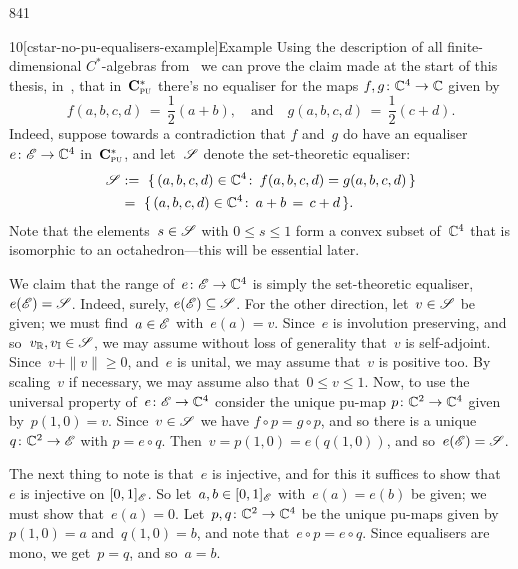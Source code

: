 \begin{parsec}{841}%
\begin{point}{10}[cstar-no-pu-equalisers-example]{Example}%
Using the description of all finite-dimensional $C^*$-algebras
    from~
we can prove the  claim made at the start of this thesis,
in~,
that in~$\mathbf{C}^*_{\text{\textsc{pu}}}$ there's no equaliser
for the maps $f,g\colon \mathbb{C}^4\to \mathbb{C}$
given  by
\begin{equation*}
\textstyle
f(a,b,c,d)\,=\, \frac{1}{2}(a+b),
\quad \text{and}\quad
g(a,b,c,d)\,=\, \frac{1}{2}(c+d).
\end{equation*}
Indeed, suppose towards a contradiction
that $f$ and~$g$ do have an
equaliser $e\colon \mathscr{E}\to\mathbb{C}^4$ in~$\mathbf{C}^*_{\text{\textsc{pu}}}$,
and let~$\mathscr{S}$
denote the set-theoretic equaliser:
\begin{alignat*}{3}
    \mathscr{S} &:=\ \{\,(a,b,c,d)\in\mathbb{C}^4\colon\, f(a,b,c,d)=g(a,b,c,d)\,\}\\
    &=\ \{\,(a,b,c,d)\in\mathbb{C}^4\colon\,a+b\,=\,c+d\,\}.
\end{alignat*}
Note that the elements~$s\in \mathscr{S}$
with $0\leq s\leq 1$
form a convex subset of~$\mathbb{C}^4$ that is isomorphic
to an octahedron---this will be essential later.

We claim that the range of~$e\colon \mathscr{E}\to\mathbb{C}^4$
is simply the set-theoretic equaliser, $e(\mathscr{E})=\mathscr{S}$.
Indeed, surely, $e(\mathscr{E}) \subseteq \mathscr{S}$.
For the other direction,
let~$v\in \mathscr{S}$ be given; we must find~$a\in\mathscr{E}$ with~$e(a)=v$.
Since~$e$ is involution preserving,
and so~$v_{\mathbb{R}},v_{\mathbb{I}}\in\mathscr{S}$,
we may assume without loss of generality that~$v$ is self-adjoint.
Since~$v+\|v\|\geq 0$, and~$e$ is unital, 
    we may assume that~$v$ is positive too.
By scaling~$v$ if necessary,
we may assume also that~$0\leq v\leq 1$.
Now, to use the universal property of~$e\colon \mathscr{E}\to\mathbb{C}^4$
consider the unique pu-map $p\colon \mathbb{C}^2\to\mathbb{C}^4$
    given by~$p(1,0)=v$.
Since~$v\in \mathscr{S}$ we have $f\circ p = g\circ p$,
and so there is a unique $q\colon \mathbb{C}^2\to\mathscr{E}$
with $p = e\circ q$.  Then~$v=p(1,0)=e(q(1,0))$,
    and so~$e(\mathscr{E})=\mathscr{S}$.

The next thing to note is that~$e$
is injective,
and for this it suffices to show
that~$e$ is injective on $[0,1]_{\mathscr{E}}$.
So let~$a,b\in[0,1]_{\mathscr{E}}$ with~$e(a)=e(b)$ be given;
we must show that~$e(a)=0$.
Let~$p,q\colon \mathbb{C}^2\to\mathbb{C}^4$ be the unique
pu-maps given by~$p(1,0)=a$ and~$q(1,0)=b$,
and note that~$e\circ p = e\circ q$.
Since equalisers are mono, we get~$p=q$, and so~$a=b$.


\end{point}
\end{parsec}
